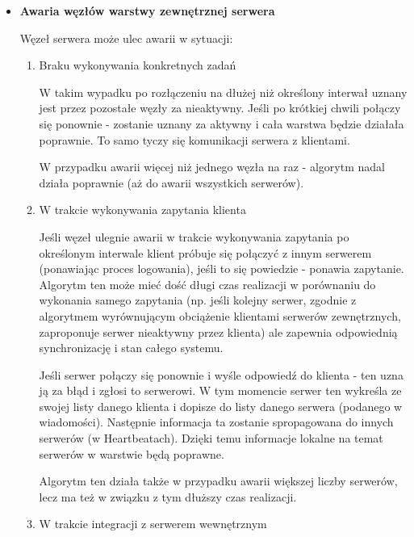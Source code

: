 {\begin{itemize}
\item \textbf{Awaria węzłów warstwy zewnętrznej serwera}
\par {Węzeł serwera może ulec awarii w sytuacji:}
\begin{enumerate}
\item Braku wykonywania konkretnych zadań
\par{W takim wypadku po rozłączeniu na dłużej niż określony interwał uznany jest przez pozostałe węzły za nieaktywny. Jeśli po krótkiej chwili połączy się ponownie - zostanie uznany za aktywny i cała warstwa będzie działała poprawnie. To samo tyczy się komunikacji serwera z klientami.}
\par {W przypadku awarii więcej niż jednego węzła na raz - algorytm nadal działa poprawnie (aż do awarii wszystkich serwerów).}

\item W trakcie wykonywania zapytania klienta
\par{Jeśli węzeł ulegnie awarii w trakcie wykonywania zapytania po określonym interwale klient próbuje się połączyć z innym serwerem (ponawiając proces logowania), jeśli to się powiedzie - ponawia zapytanie. Algorytm ten może mieć dość długi czas realizacji w porównaniu do wykonania samego zapytania (np. jeśli kolejny serwer, zgodnie z algorytmem wyrównującym obciążenie klientami serwerów zewnętrznych, zaproponuje serwer nieaktywny przez klienta) ale zapewnia odpowiednią synchronizację i stan całego systemu.}

\par{Jeśli serwer połączy się ponownie i wyśle odpowiedź do klienta - ten uzna ją za błąd i zgłosi to serwerowi. W tym momencie serwer ten wykreśla ze swojej listy danego klienta i dopisze do listy danego serwera (podanego w wiadomości). Następnie informacja ta zostanie spropagowana do innych serwerów (w Heartbeatach). Dzięki temu informacje lokalne na temat serwerów w warstwie będą poprawne.}

\par{Algorytm ten działa także w przypadku awarii większej liczby serwerów, lecz ma też w związku z tym dłuższy czas realizacji.}

\item W trakcie integracji z serwerem wewnętrznym

\end{enumerate}


\end{itemize}}
